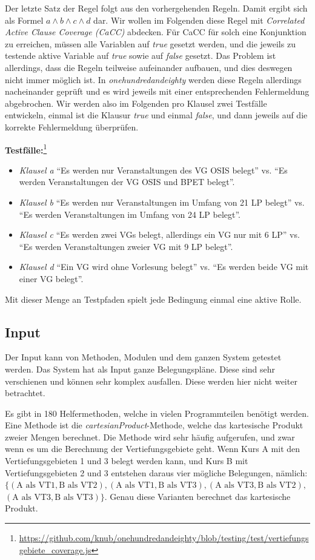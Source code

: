 \documentclass[ngerman]{article}
\begin{document}
Der letzte Satz der Regel folgt aus den vorhergehenden Regeln.
Damit ergibt sich als Formel $a \land b \land c \land d$ dar.
Wir wollen im Folgenden diese Regel mit \emph{Correlated Active Clause Coverage (CaCC)} abdecken.
Für CaCC für solch eine Konjunktion zu erreichen, müssen alle Variablen auf \emph{true} gesetzt werden, und die jeweils zu testende aktive Variable auf \emph{true} sowie auf \emph{false} gesetzt.
Das Problem ist allerdings, dass die Regeln teilweise aufeinander aufbauen, und dies deswegen nicht immer möglich ist.
In \emph{onehundredandeighty} werden diese Regeln allerdings nacheinander geprüft und es wird jeweils mit einer entsprechenden Fehlermeldung abgebrochen.
Wir werden also im Folgenden pro Klausel zwei Testfälle entwickeln, einmal ist die Klausur \emph{true} und einmal \emph{false}, und dann jeweils auf die korrekte Fehlermeldung überprüfen.

\textbf{Testfälle:}\footnote{\url{https://github.com/knub/onehundredandeighty/blob/testing/test/vertiefungsgebiete_coverage.js}} \\
\begin{itemize}
    \item \emph{Klausel a}
        ``Es werden nur Veranstaltungen des VG OSIS belegt'' vs. ``Es werden Veranstaltungen der VG OSIS und BPET belegt''.
    \item \emph{Klausel b}
        ``Es werden nur Veranstaltungen im Umfang von 21 LP belegt'' vs. ``Es werden Veranstaltungen im Umfang von 24 LP belegt''.
    \item \emph{Klausel c}
        ``Es werden zwei VGs belegt, allerdings ein VG nur mit 6 LP'' vs. ``Es werden Veranstaltungen zweier VG mit 9 LP belegt''.
    \item \emph{Klausel d}
        ``Ein VG wird ohne Vorlesung belegt'' vs. ``Es werden beide VG mit einer VG belegt''.
\end{itemize}

Mit dieser Menge an Testpfaden spielt jede Bedingung einmal eine aktive Rolle.

\subsection{Input}
Der Input kann von Methoden, Modulen und dem ganzen System getestet werden.
Das System hat als Input ganze Belegungspläne.
Diese sind sehr verschienen und können sehr komplex ausfallen.
Diese werden hier nicht weiter betrachtet.

Es gibt in 180 Helfermethoden, welche in vielen Programmteilen benötigt werden. Eine Methode ist die \emph{cartesianProduct}-Methode, welche das kartesische Produkt zweier Mengen berechnet.
Die Methode wird sehr häufig aufgerufen, und zwar wenn es um die Berechnung der Vertiefungsgebiete geht.
Wenn Kurs A mit den Vertiefungsgebieten 1 und 3 belegt werden kann, und Kurs B mit Vertiefungsgebieten 2 und 3 entstehen daraus vier mögliche Belegungen, nämlich: \\
$\{ (\text{A als VT1}, \text{B als VT2}), (\text{A als VT1}, \text{B als VT3}), (\text{A als VT3}, \text{B als VT2}),$ \\ $(\text{A als VT3}, \text{B als VT3}) \}$.
Genau diese Varianten berechnet das kartesische Produkt.
\end{document}
